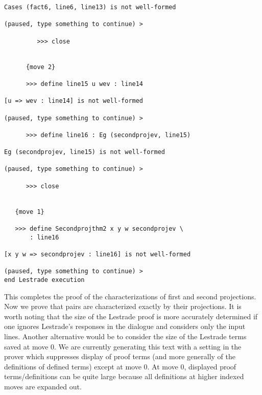 \documentclass[12pt]{article}
\begin{document}
\begin{verbatim}
Cases (fact6, line6, line13) is not well-formed

(paused, type something to continue) >

         >>> close


      {move 2}

      >>> define line15 u wev : line14

[u => wev : line14] is not well-formed

(paused, type something to continue) >

      >>> define line16 : Eg (secondprojev, line15)

Eg (secondprojev, line15) is not well-formed

(paused, type something to continue) >

      >>> close


   {move 1}

   >>> define Secondprojthm2 x y w secondprojev \
       : line16

[x y w => secondprojev : line16] is not well-formed

(paused, type something to continue) >
end Lestrade execution
\end{verbatim}

This completes the proof of the characterizations of first and second projections.  Now we prove that pairs are characterized exactly by their projections.  It is worth noting that
the size of the Lestrade proof is more accurately determined if one ignores Lestrade's responses in the dialogue and considers only the input lines.  Another alternative would be to consider the size of the Lestrade terms saved at move 0.  We are currently generating this text with a setting in the prover which suppresses display of proof terms
(and more generally of the definitions of defined terms) except at move 0.  At move 0, displayed proof terms/definitions can be quite large because all definitions at higher indexed moves are expanded out.
\end{document}
